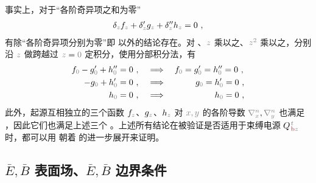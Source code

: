 事实上，对于“各阶奇异项之和为零”
\abovedisplayskip=8pt
\begin{align} \label{eq:deltasum=0}
	{\delta}_{\mathcolor{gray}{z}} f_{\mathcolor{gray}{z}} + {\delta}'_{\mathcolor{gray}{z}} g_{\mathcolor{gray}{z}} + 
	{\delta}''_{\mathcolor{gray}{z}} h_{\mathcolor{gray}{z}} = 0 ~,
\end{align}
有除“各阶奇异项分别为零”即  以外的结论存在。对 、$\mathcolor{gray}{z}$ 乘以之、$\mathcolor{gray}{z^2}$ 乘以之，分别沿 $\mathcolor{gray}{z}$ 做跨越过 $\mathcolor{gray}{z} = \mathcolor{gray}{0}$ 定积分，使用分部积分法\cite{delangeElectromagneticBoundaryConditions2013}，有
\begin{subequations} \label{eq:Intdeltasum=0}
	\belowdisplayskip=8pt
\begin{align}
	f_{\mathcolor{gray}{0}} - g'_{\mathcolor{gray}{0}} + h''_{\mathcolor{gray}{0}} &= 0~, \hspace{1.2em} \Longrightarrow \hspace{1em} f_{\mathcolor{gray}{0}} = g'_{\mathcolor{gray}{0}} = h''_{\mathcolor{gray}{0}} = 0~, \label{eq:intdeltasum=0} \\
	- g_{\mathcolor{gray}{0}} + h'_{\mathcolor{gray}{0}} &= 0~, \hspace{1.2em} \Longrightarrow \hspace{1em} \hphantom{f_{\mathcolor{gray}{0}} =}~\;\! g_{\mathcolor{gray}{0}} = h'_{\mathcolor{gray}{0}} = 0~, \label{eq:intzdeltasum=0} \\
	h_{\mathcolor{gray}{0}} &= 0~, \hspace{1.2em} \Longrightarrow \hspace{1em} \hphantom{f_{\mathcolor{gray}{0}} = g_{\mathcolor{gray}{0}} =}~\;\! h_{\mathcolor{gray}{0}} = 0~, \label{eq:intzzdeltasum=0}
\end{align}
\end{subequations}
此外，起源互相独立的三个函数 $f_{\mathcolor{gray}{z}}$、$g_{\mathcolor{gray}{z}}$、$h_{\mathcolor{gray}{z}}$ 对 $\mathcolor{gray}{x,y}$ 的各阶导数 $\mathcolor{gray}{\nabla_x^n},\mathcolor{gray}{\nabla_y^n}$ 也满足 ，因此它们也满足上述三个 。上述所有结论在被验证是否适用于束缚电源 ${Q}^{\;\!\mathcolor{gray}{t}}_{\;\!\textcolor{Maroon}{\text{b}}\mathcolor{gray}{z}}$ 时，都可以用  朝着  的进一步展开来证明。

\vspace*{-4.5em}

\subsection{$\bar{E},\bar{B}$ 表面场、$\bar{E},\bar{B}$ 边界条件}\label{ssec:EB-boundary}

